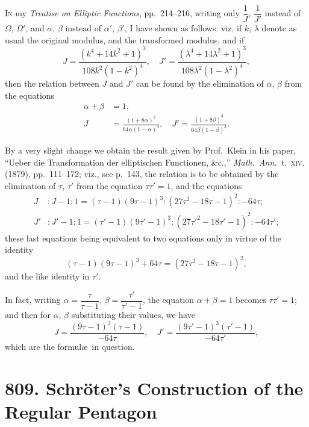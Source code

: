 \documentclass[11pt,a4paper]{article}
\theoremstyle{plain}
\theoremstyle{definition}
\theoremstyle{remark}
\begin{document}
\bigskip

\noindent
\textsc{In} my \textit{Treatise on Elliptic Functions}, pp.~214--216, writing only $\dfrac{1}{J}$, $\dfrac{1}{J'}$ instead of $\Omega$, $\Omega'$, and $\alpha$, $\beta$ instead of $\alpha'$, $\beta'$, I have shown as follows: viz. if $k$, $\lambda$ denote as usual the original modulus, and the transformed modulus, and if
\[
J = \frac{(k^4+14k^2+1)^3}{108k^2(1-k^2)^4},\quad J' = \frac{(\lambda^4+14\lambda^2+1)^3}{108\lambda^2(1-\lambda^2)^4},
\]
then the relation between $J$ and $J'$ can be found by the elimination of $\alpha$, $\beta$ from the equations
\begin{align*}
\alpha + \beta &= 1,\\
J &= \frac{(1+8\alpha)^3}{64\alpha(1-\alpha)^3},\quad J' = \frac{(1+8\beta)^3}{64\beta(1-\beta)^3}.
\end{align*}

By a very slight change we obtain the result given by Prof.~Klein in his paper, ``Ueber die Transformation der elliptischen Functionen, \&c.,'' \textit{Math.\ Ann.}\ t.~\textsc{xiv.} (1879), pp.~111--172; viz., see p.~143, the relation is to be obtained by the elimination of $\tau$, $\tau'$ from the equation $\tau\tau' = 1$, and the equations
\begin{align*}
J &: J-1 : 1 = (\tau-1)(9\tau-1)^3 : (27\tau^2 - 18\tau - 1)^2 : -64\tau;\\
J' &: J'-1 : 1 = (\tau'-1)(9\tau'-1)^3 : (27\tau'^2 - 18\tau' - 1)^2 : -64\tau';
\end{align*}
these last equations being equivalent to two equations only in virtue of the identity
\[
(\tau-1)(9\tau-1)^3 + 64\tau = (27\tau^2 - 18\tau - 1)^2,
\]
and the like identity in $\tau'$.

In fact, writing $\alpha = \dfrac{\tau}{\tau-1}$, $\beta = \dfrac{\tau'}{\tau'-1}$, the equation $\alpha + \beta = 1$ becomes $\tau\tau' = 1$; and then for $\alpha$, $\beta$ substituting their values, we have
\[
J = \frac{(9\tau-1)^3(\tau-1)}{-64\tau},\quad J' = \frac{(9\tau'-1)^3(\tau'-1)}{-64\tau'},
\]
which are the formul\ae\ in question.


\newpage
\section*{809. Schr\"{o}ter's Construction of the Regular Pentagon}
\end{document}
